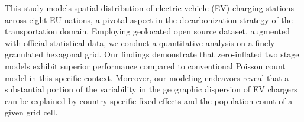 
\begin{Abstrakt}
    This study models spatial distribution of electric vehicle (EV) charging stations across eight EU nations, a pivotal aspect in the decarbonization strategy of the transportation domain. Employing geolocated open source dataset, augmented with official statistical data, we conduct a quantitative analysis on a finely granulated hexagonal grid. Our findings demonstrate that zero-inflated two stage models exhibit superior performance compared to conventional Poisson count model in this specific context. Moreover, our modeling endeavors reveal that a substantial portion of the variability in the geographic dispersion of EV chargers can be explained by country-specific fixed effects and the population count of a given grid cell.
\end{Abstrakt}



\clearpage